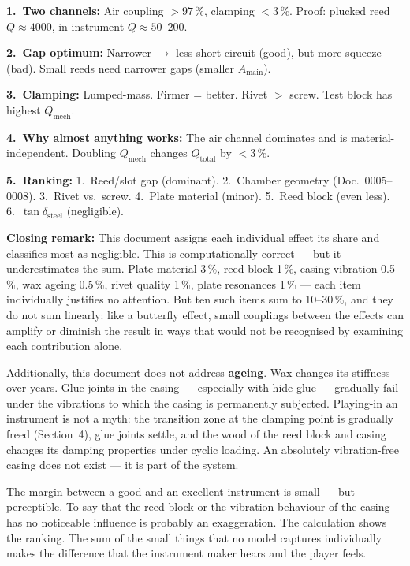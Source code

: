 \documentclass[11pt,a4paper]{article}
\begin{document}
\begin{keybox}
\textbf{1.\ Two channels:} Air coupling $> 97\,\%$, clamping $< 3\,\%$. Proof: plucked reed $Q \approx 4000$, in instrument $Q \approx 50$--$200$.

\textbf{2.\ Gap optimum:} Narrower $\to$ less short-circuit (good), but more squeeze (bad). Small reeds need narrower gaps (smaller $A_\text{main}$).

\textbf{3.\ Clamping:} Lumped-mass. Firmer = better. Rivet $>$ screw. Test block has highest $Q_\text{mech}$.

\textbf{4.\ Why almost anything works:} The air channel dominates and is material-independent. Doubling $Q_\text{mech}$ changes $Q_\text{total}$ by $< 3\,\%$.

\textbf{5.\ Ranking:} 1.~Reed/slot gap (dominant). 2.~Chamber geometry (Doc.~0005--0008). 3.~Rivet vs.\ screw. 4.~Plate material (minor). 5.~Reed block (even less). 6.~$\tan\delta_\text{steel}$ (negligible).
\end{keybox}

\vspace{4mm}
\textbf{Closing remark:} This document assigns each individual effect its share and classifies most as negligible. This is computationally correct --- but it underestimates the sum. Plate material 3\,\%, reed block 1\,\%, casing vibration 0.5\,\%, wax ageing 0.5\,\%, rivet quality 1\,\%, plate resonances 1\,\% --- each item individually justifies no attention. But ten such items sum to 10--30\,\%, and they do not sum linearly: like a butterfly effect, small couplings between the effects can amplify or diminish the result in ways that would not be recognised by examining each contribution alone.

Additionally, this document does not address \textbf{ageing}. Wax changes its stiffness over years. Glue joints in the casing --- especially with hide glue --- gradually fail under the vibrations to which the casing is permanently subjected. Playing-in an instrument is not a myth: the transition zone at the clamping point is gradually freed (Section~4), glue joints settle, and the wood of the reed block and casing changes its damping properties under cyclic loading. An absolutely vibration-free casing does not exist --- it is part of the system.

The margin between a good and an excellent instrument is small --- but perceptible. To say that the reed block or the vibration behaviour of the casing has no noticeable influence is probably an exaggeration. The calculation shows the ranking. The sum of the small things that no model captures individually makes the difference that the instrument maker hears and the player feels.
\end{document}
